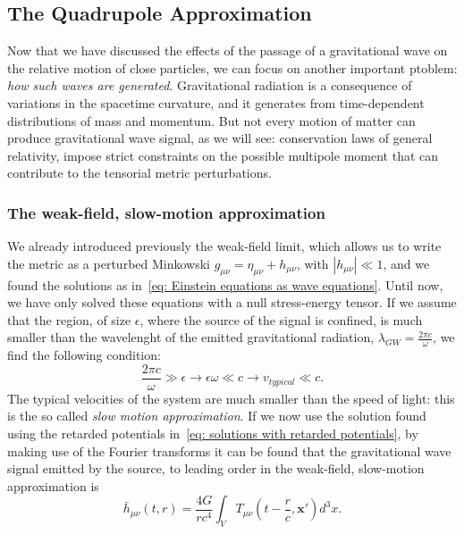 \subsection{The Quadrupole Approximation}
Now that we have discussed the effects of the passage of a gravitational wave on the relative motion of close particles, we can focus on another important ptoblem: \textit{how such waves are generated}.
Gravitational radiation is a consequence of variations in the spacetime curvature, and it generates from time-dependent distributions of mass and momentum.
But not every motion of matter can produce gravitational wave signal, as we will see: conservation laws of general relativity, impose strict constraints on the possible multipole moment that can contribute to the tensorial metric perturbations.


\subsubsection{The weak-field, slow-motion approximation}
We already introduced previously the weak-field limit, which allows us to write the metric as a perturbed Minkowski $g_{\mu\nu}=\eta_{\mu\nu} + h_{\mu\nu}$, with $|h_{\mu\nu}|\ll 1$, and we found the solutions as in~\eqref{eq: Einstein equations as wave equations}.
Until now, we have only solved these equations with a null stress-energy tensor.
If we assume that the region, of size $\epsilon$, where the source of the signal is confined, is much smaller than the wavelenght of the emitted gravitational radiation, $\lambda_{GW} = \frac{2\pi c}{\omega}$, we find the following condition:
\begin{equation}
    \frac{2\pi c}{\omega}\gg \epsilon \to \epsilon\omega \ll c \to v_{typical} \ll c.
    \label{eq: slow motion approximation}
\end{equation}
The typical velocities of the system are much smaller than the speed of light: this is the so called \textit{slow motion approximation}.
If we now use the solution found using the retarded potentials in~\eqref{eq: solutions with retarded potentials}, by making use of the Fourier transforms it can be found that the gravitational wave signal emitted by the source, to leading order in the weak-field, slow-motion approximation is
\begin{equation}
    \bar{h}_{\mu\nu}(t,r) = \frac{4G}{rc^4}\int_V T_{\mu\nu}(t-\frac{r}{c}, \mathbf{x}')d^3x.
    \label{eq: weak-field slow-motion solutions}
\end{equation}

